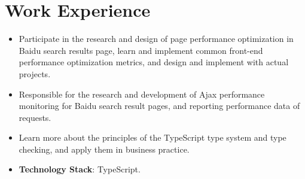 \documentclass{resume}
\newcommand{\en}[1]{#1}
\newcommand{\zh}[1]{}
\begin{document}
\section{\en{Work Experience}\zh{工作经历}}
\en{}
\zh{\datedsubsection{\textbf{\href{https://home.baidu.com/}{百度（Baidu Inc.）}}}{2022/06 -- 至今}}
\en{}
\zh{\role{搜索产品研发部}{前端研发实习}}
\begin{itemize}
  \item \en{Participate in the research and design of page performance optimization in Baidu search results page, learn and implement common front-end performance optimization metrics, and design and implement with actual projects.}
        \zh{参与百度搜索结果页中页面性能优化的调研与设计，学习和落地常见的前端性能优化指标，并结合实际项目进行设计和实现}
  \item \en{Responsible for the research and development of Ajax performance monitoring for Baidu search result pages, and reporting performance data of requests.}
        \zh{负责百度搜索结果页 Ajax 无埋点性能监控的调研与开发，对请求的性能数据进行上报}
  \item \en{Learn more about the principles of the TypeScript type system and type checking, and apply them in business practice.}
        \zh{进一步学习深入学习 TypeScript 类型系统与类型检查的原理，并在业务实践中加以应用}
  \item \en{\textbf{Technology Stack}: TypeScript.}
        \zh{\textbf{技术栈}: TypeScript}
\end{itemize}
\end{document}
